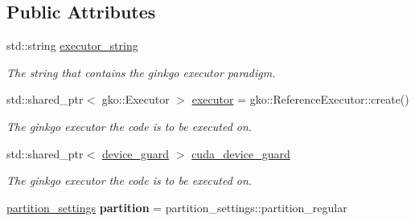\subsection*{Public Attributes}
\begin{DoxyCompactItemize}
\item 
\mbox{\label{structSchwarzWrappers_1_1Settings_a737e5de9833ab6f27606103b907ec06e}} 
std\+::string \hyperlink{structSchwarzWrappers_1_1Settings_a737e5de9833ab6f27606103b907ec06e}{executor\+\_\+string}
\begin{DoxyCompactList}\small\item\em The string that contains the ginkgo executor paradigm. \end{DoxyCompactList}\item 
\mbox{\label{structSchwarzWrappers_1_1Settings_a5fef952364864a479eaab9e44d99b525}} 
std\+::shared\+\_\+ptr$<$ gko\+::\+Executor $>$ \hyperlink{structSchwarzWrappers_1_1Settings_a5fef952364864a479eaab9e44d99b525}{executor} = gko\+::\+Reference\+Executor\+::create()
\begin{DoxyCompactList}\small\item\em The ginkgo executor the code is to be executed on. \end{DoxyCompactList}\item 
\mbox{\label{structSchwarzWrappers_1_1Settings_aab3c76df1bcfbc997eb3f2c1a3e1d96e}} 
std\+::shared\+\_\+ptr$<$ \hyperlink{classSchwarzWrappers_1_1device__guard}{device\+\_\+guard} $>$ \hyperlink{structSchwarzWrappers_1_1Settings_aab3c76df1bcfbc997eb3f2c1a3e1d96e}{cuda\+\_\+device\+\_\+guard}
\begin{DoxyCompactList}\small\item\em The ginkgo executor the code is to be executed on. \end{DoxyCompactList}\item 
\mbox{\label{structSchwarzWrappers_1_1Settings_ade1f66243d1d3d8087b453f483af9d98}} 
\hyperlink{structSchwarzWrappers_1_1Settings_a5b3a60043fc866039d760e5357c17f6d}{partition\+\_\+settings} {\bfseries partition} = partition\+\_\+settings\+::partition\+\_\+regular
\item 
\mbox{\label{structSchwarzWrappers_1_1Settings_ab1be4bd623b4cf1c8999160e753752ff}} 

\end{DoxyCompactItemize}
